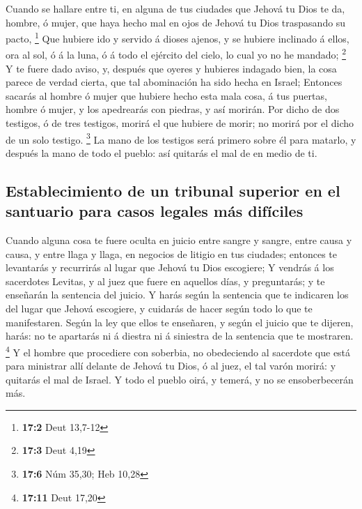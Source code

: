  Cuando se hallare entre ti, en alguna de tus ciudades que
Jehová tu Dios te da, hombre, ó mujer, que haya hecho mal en ojos de
Jehová tu Dios traspasando su pacto, \footnote{\textbf{17:2} Deut
  13,7-12}  Que hubiere ido y servido á dioses ajenos, y
se hubiere inclinado á ellos, ora al sol, ó á la luna, ó á todo el
ejército del cielo, lo cual yo no he mandado; \footnote{\textbf{17:3}
  Deut 4,19}  Y te fuere dado aviso, y, después que oyeres
y hubieres indagado bien, la cosa parece de verdad cierta, que tal
abominación ha sido hecha en Israel;  Entonces sacarás al
hombre ó mujer que hubiere hecho esta mala cosa, á tus puertas, hombre ó
mujer, y los apedrearás con piedras, y así morirán.  Por
dicho de dos testigos, ó de tres testigos, morirá el que hubiere de
morir; no morirá por el dicho de un solo testigo. \footnote{\textbf{17:6}
  Núm 35,30; Heb 10,28}  La mano de los testigos será
primero sobre él para matarlo, y después la mano de todo el pueblo: así
quitarás el mal de en medio de ti.

\hypertarget{establecimiento-de-un-tribunal-superior-en-el-santuario-para-casos-legales-muxe1s-difuxedciles}{%
\subsection{Establecimiento de un tribunal superior en el santuario para
casos legales más
difíciles}\label{establecimiento-de-un-tribunal-superior-en-el-santuario-para-casos-legales-muxe1s-difuxedciles}}

 Cuando alguna cosa te fuere oculta en juicio entre sangre
y sangre, entre causa y causa, y entre llaga y llaga, en negocios de
litigio en tus ciudades; entonces te levantarás y recurrirás al lugar
que Jehová tu Dios escogiere;  Y vendrás á los sacerdotes
Levitas, y al juez que fuere en aquellos días, y preguntarás; y te
enseñarán la sentencia del juicio.  Y harás según la
sentencia que te indicaren los del lugar que Jehová escogiere, y
cuidarás de hacer según todo lo que te manifestaren. 
Según la ley que ellos te enseñaren, y según el juicio que te dijeren,
harás: no te apartarás ni á diestra ni á siniestra de la sentencia que
te mostraren. \footnote{\textbf{17:11} Deut 17,20}  Y el
hombre que procediere con soberbia, no obedeciendo al sacerdote que está
para ministrar allí delante de Jehová tu Dios, ó al juez, el tal varón
morirá: y quitarás el mal de Israel.  Y todo el pueblo
oirá, y temerá, y no se ensoberbecerán más.

